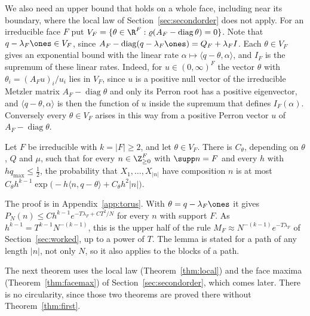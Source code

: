 We also need an upper bound that holds on a whole face, including near its
boundary, where the local law of Section~\ref{sec:secondorder} does not apply.
For an irreducible face $F$ put
$V_F=\{\theta\in\R^F:\varrho(A_F-\operatorname{diag}\theta)=0\}$. Note that
$q-\lambda_F\ones\in V_F$, since $A_F-\operatorname{diag}(q-\lambda_F\ones)
=Q_F+\lambda_FI$. Each $\theta\in V_F$ gives an exponential bound with the
linear rate $\alpha\mapsto\langle q-\theta,\alpha\rangle$, and $I_F$ is the
supremum of these linear rates. Indeed, for $u\in(0,\infty)^F$ the vector
$\theta$ with $\theta_i=(A_Fu)_i/u_i$ lies in $V_F$, since $u$ is a positive
null vector of the irreducible Metzler matrix $A_F-\operatorname{diag}\theta$
and only its Perron root has a positive eigenvector, and
$\langle q-\theta,\alpha\rangle$ is then the function of $u$ inside the
supremum that defines $I_F(\alpha)$. Conversely every $\theta\in V_F$ arises
in this way from a positive Perron vector $u$ of $A_F-\operatorname{diag}\theta$.

\begin{lemma}\label{lem:upper}
Let $F$ be irreducible with $k=\lvert F\rvert\ge2$, and let $\theta\in V_F$.
There is $C_\theta$, depending on $\theta$, $Q$ and $\mu$, such that for every
$n\in\Z_{\ge0}^F$ with $\supp n=F$ and every $h$ with $hq_{\max}\le\frac12$,
the probability that $X_1,\dots,X_{\lvert n\rvert}$ have composition $n$ is
at most
$C_\theta h^{k-1}\exp\bigl(-h\langle n,q-\theta\rangle+C_\theta h^2\lvert
n\rvert\bigr)$.
\end{lemma}

The proof is in Appendix~\ref{app:torus}. With $\theta=q-\lambda_F\ones$ it
gives $P_N(n)\le Ch^{k-1}e^{-T\lambda_F+CT^2/N}$ for every $n$ with support
$F$. As $h^{k-1}=T^{k-1}N^{-(k-1)}$, this is the upper half of the rule
$M_F\approx N^{-(k-1)}e^{-T\lambda_F}$ of Section~\ref{sec:worked}, up to a
power of $T$. The lemma is stated for a path of any length $\lvert n\rvert$,
not only $N$, so it also applies to the blocks of a path.

The next theorem uses the local law (Theorem~\ref{thm:local}) and the face
maxima (Theorem~\ref{thm:facemax}) of Section~\ref{sec:secondorder}, which
comes later. There is no circularity, since those two theorems are proved
there without Theorem~\ref{thm:first}.

